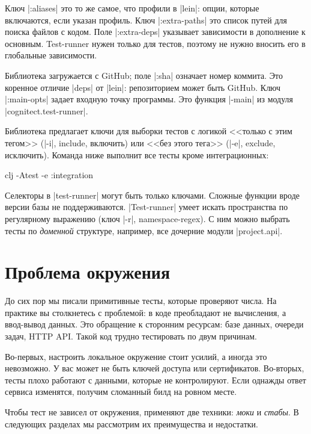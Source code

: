Ключ \spverb|:aliases| это то же самое, что профили в \spverb|lein|: опции,
которые включаются, если указан профиль. Ключ \spverb|:extra-paths| это список
путей для поиска файлов с кодом. Поле \spverb|:extra-deps| указывает зависимости
в дополнение к основным. Test-runner нужен только для тестов, поэтому не нужно
вносить его в глобальные зависимости.


Библиотека загружается с GitHub; поле \spverb|:sha| означает номер коммита. Это
коренное отличие \spverb|deps| от \spverb|lein|: репозиторием может быть
GitHub. Ключ \spverb|:main-opts| задает входную точку программы. Это функция
\spverb|-main| из модуля \spverb|cognitect.test-runner|.

Библиотека предлагает ключи для выборки тестов с логикой <<только с этим тегом>>
(\spverb|-i|, include, включить) или <<без этого тега>> (\spverb|-e|, exclude,
исключить). Команда ниже выполнит все тесты кроме интеграционных:

\begin{english}
  \begin{bash}
clj -Atest -e :integration
  \end{bash}
\end{english}

Селекторы в \spverb|test-runner| могут быть только ключами. Сложные функции
вроде версии базы не поддерживаются. \spverb|Test-runner| умеет искать
пространства по регулярному выражению (ключ \spverb|-r|, namespace-regex). С ним
можно выбрать тесты по \emph{доменной} структуре, например, все дочерние модули
\spverb|project.api|.

\section{Проблема окружения}

До сих пор мы писали примитивные тесты, которые проверяют числа. На практике вы
столкнетесь с проблемой: в коде преобладают не вычисления, а ввод-вывод
данных. Это обращение к сторонним ресурсам: базе данных, очереди задач, HTTP
API. Такой код трудно тестировать по двум причинам.

Во-первых, настроить локальное окружение стоит усилий, а иногда это
невозможно. У вас может не быть ключей доступа или сертификатов. Во-вторых,
тесты плохо работают с данными, которые не контролируют. Если однажды ответ
сервиса изменятся, получим сломанный билд на ровном месте.

Чтобы тест не зависел от окружения, применяют две техники: \emph{моки} и
\emph{стабы}. В следующих разделах мы рассмотрим их преимущества и недостатки.

